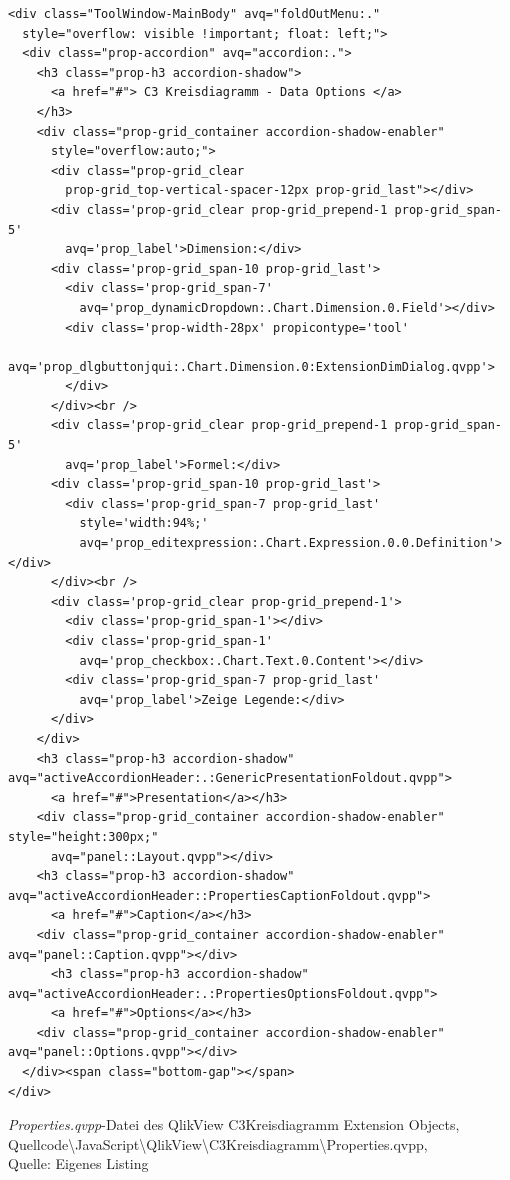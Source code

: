 \begin{appendix}
\begin{listing}[htbp]
\begin{verbatim}
<div class="ToolWindow-MainBody" avq="foldOutMenu:."
  style="overflow: visible !important; float: left;">
  <div class="prop-accordion" avq="accordion:.">
    <h3 class="prop-h3 accordion-shadow">
      <a href="#"> C3 Kreisdiagramm - Data Options </a>
    </h3>
    <div class="prop-grid_container accordion-shadow-enabler"
      style="overflow:auto;">
      <div class="prop-grid_clear 
        prop-grid_top-vertical-spacer-12px prop-grid_last"></div>
      <div class='prop-grid_clear prop-grid_prepend-1 prop-grid_span-5'
        avq='prop_label'>Dimension:</div>
      <div class='prop-grid_span-10 prop-grid_last'>
        <div class='prop-grid_span-7' 
          avq='prop_dynamicDropdown:.Chart.Dimension.0.Field'></div>
        <div class='prop-width-28px' propicontype='tool'
          avq='prop_dlgbuttonjqui:.Chart.Dimension.0:ExtensionDimDialog.qvpp'>
        </div>
      </div><br />
      <div class='prop-grid_clear prop-grid_prepend-1 prop-grid_span-5'
        avq='prop_label'>Formel:</div>
      <div class='prop-grid_span-10 prop-grid_last'>
        <div class='prop-grid_span-7 prop-grid_last'
          style='width:94%;' 
          avq='prop_editexpression:.Chart.Expression.0.0.Definition'></div>
      </div><br />
      <div class='prop-grid_clear prop-grid_prepend-1'>
        <div class='prop-grid_span-1'></div>
        <div class='prop-grid_span-1' 
          avq='prop_checkbox:.Chart.Text.0.Content'></div>
        <div class='prop-grid_span-7 prop-grid_last'
          avq='prop_label'>Zeige Legende:</div>
      </div>
    </div>
    <h3 class="prop-h3 accordion-shadow" avq="activeAccordionHeader:.:GenericPresentationFoldout.qvpp">
      <a href="#">Presentation</a></h3>
    <div class="prop-grid_container accordion-shadow-enabler" style="height:300px;"
      avq="panel::Layout.qvpp"></div>
    <h3 class="prop-h3 accordion-shadow" avq="activeAccordionHeader::PropertiesCaptionFoldout.qvpp">
      <a href="#">Caption</a></h3>
    <div class="prop-grid_container accordion-shadow-enabler" avq="panel::Caption.qvpp"></div>
      <h3 class="prop-h3 accordion-shadow" avq="activeAccordionHeader:.:PropertiesOptionsFoldout.qvpp">
      <a href="#">Options</a></h3>
    <div class="prop-grid_container accordion-shadow-enabler" avq="panel::Options.qvpp"></div>
  </div><span class="bottom-gap"></span>
</div>
\end{verbatim}
\caption[\textit{Properties.qvpp}-Datei des QlikView C3Kreisdiagramm Extension Objects]{\textit{Properties.qvpp}-Datei des QlikView C3Kreisdiagramm Extension Objects, Quellcode\textbackslash{}JavaScript\textbackslash{}QlikView\textbackslash{}C3Kreisdiagramm\textbackslash{}Properties.qvpp, \\Quelle: Eigenes Listing}
\label{lst:QlikViewJavascriptC3KreisdiagrammSkript}
\end{listing}


\end{appendix}
